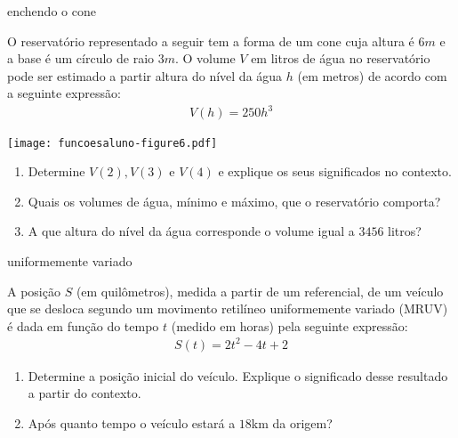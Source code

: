 \documentclass[extrafontsizes, twoside, 11pt, openright, final]{memoir}
\begin{document}
\begin{task}{ enchendo o cone}
	\label{\detokenize{AF106-2:atividade-enchendo-o-cone}}\label{\detokenize{AF106-2:ativ-funcoes-enchendo-o-cone}}

	O reservatório representado a seguir tem a forma de um cone cuja altura é $6 m$ e a base é um círculo de raio $3 m$. O volume $V$ em litros de água no reservatório pode ser estimado a partir altura do nível da água $h$ (em metros) de acordo com a seguinte expressão:
	\begin{equation*}
		\begin{split}V(h)=250h^3\end{split}
	\end{equation*}
	\begin{center}
		\texttt{[image: funcoesaluno-figure6.pdf]}
	\end{center}
	\begin{enumerate}
		\item Determine $V(2), V(3)$ e $V(4)$ e explique os seus significados no contexto.

		\item Quais os volumes de água, mínimo e máximo, que o reservatório comporta?

		\item A que altura do nível da água corresponde o volume igual a $3 456$ litros?

	\end{enumerate}
\end{task}

\begin{task}{ uniformemente variado}
	\label{\detokenize{AF106-2:atividade-uniformemente-variado}}\label{\detokenize{AF106-2:ativ-funcoes-uniformemente-variado}}

	A posição $S$ (em quilômetros), medida a partir de um referencial, de um veículo que se desloca segundo um movimento retilíneo uniformemente variado (MRUV) é dada em função do tempo $t$ (medido em horas) pela seguinte expressão:
	\begin{equation*}
		\begin{split}S(t)=2t^2-4t+2\end{split}
	\end{equation*}\begin{enumerate}
		\item Determine a posição inicial do veículo. Explique o significado desse resultado a partir do contexto.

		\item Após quanto tempo o veículo estará a $18$km da origem?

	\end{enumerate}
\end{task}
\end{document}
